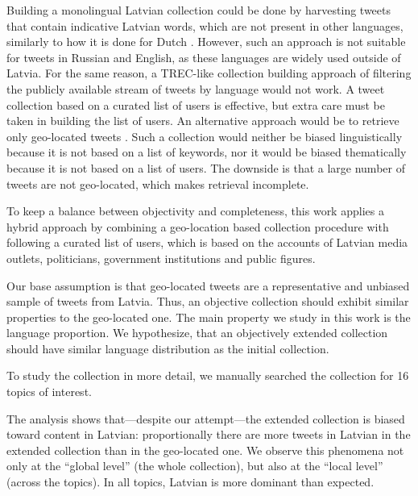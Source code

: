 \documentclass{IOS-Book-Article}
\newcommand{\hl}[1]{#1}
\begin{document}
%
Building a monolingual Latvian collection could be done by harvesting tweets that contain indicative Latvian words, which are not present in other languages, similarly to how it is done for Dutch \cite{sang2013}. However, such an approach is not suitable for tweets in Russian and English, as these languages are widely used outside of Latvia.
%
For the same reason, a TREC-like collection building approach \cite{lin2017rts} of filtering the publicly available stream of tweets by language would not work.
%
A tweet collection based on a curated list of users \cite{SANVICENTE16.465,L14-1642} is effective, but extra care must be taken in building the list of users.
%
An alternative approach would be to retrieve only geo-located tweets \cite{coats_steven_2017,milajevs:2017:BUCC}. Such a collection would neither be biased linguistically because it is not based on a list of keywords, nor it would be biased thematically because it is not based on a list of users. The downside is that a large number of tweets are not geo-located, which makes retrieval incomplete.

To keep a balance between objectivity and completeness, this work applies a hybrid approach by combining a geo-location based collection procedure with following a curated list of users, which is based on the accounts of Latvian media outlets, politicians, government institutions and public figures.

Our base assumption is that geo-located tweets are a representative and unbiased sample of tweets from Latvia. Thus, an objective collection should exhibit similar properties to the geo-located one. The main property we study in this work is the language proportion. We hypothesize, that an objectively extended collection should have similar language distribution as the initial collection.

To study the collection in more detail, we manually searched the collection for \hl{16} topics of interest.


The analysis shows that---despite our attempt---the extended collection is biased toward content in Latvian: proportionally there are more tweets in Latvian in the extended collection than in the geo-located one. We observe this phenomena not only at the ``global level'' (the whole collection), but also at the ``local level'' (across the topics). \hl{In all topics, Latvian is more dominant than expected.}
\end{document}

